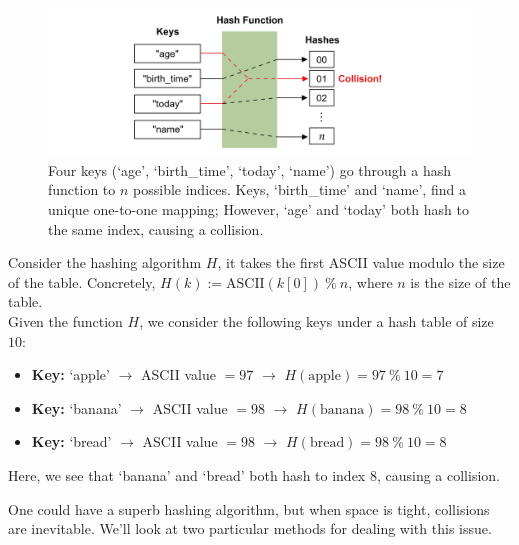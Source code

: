 \begin{figure}[ht!]

    \centering
    \includegraphics[width=\textwidth]{Sections/hash/collision.png}
    \caption{Four keys (`age', `birth\_time', `today', `name') go through a hash function to $n$ possible indices.
    Keys, `birth\_time' and `name', find a unique one-to-one mapping; However, `age' and `today' both hash to the same index, causing a collision.}
    \label{fig:collision}
\end{figure}
\begin{Example}

    Consider the hashing algorithm $H$, it takes the first ASCII value modulo the size 
    of the table. Concretely, $H(k):=\text{ASCII}(k[0])\ \%\ n$, where $n$ is the size of the table.\\

    \noindent
    Given the function $H$, we consider the following keys under a hash table of size $10$:

    \begin{itemize}
        \item \textbf{Key:} `apple' $\rightarrow$ ASCII value $=97$ $\rightarrow$ $H(\text{apple})=97\ \%\ 10 = 7$
        \item \textbf{Key:} `banana' $\rightarrow$ ASCII value $=98$ $\rightarrow$ $H(\text{banana})=98\ \%\ 10 = 8$
        \item \textbf{Key:} `bread' $\rightarrow$ ASCII value $=98$ $\rightarrow$ $H(\text{bread})=98\ \%\ 10 = 8$
    \end{itemize}
    
    \noindent
    Here, we see that `banana' and `bread' both hash to index $8$, causing a collision.
\end{Example}
One could have a superb hashing algorithm, but when space is tight, collisions are inevitable. We'll look at two particular methods for dealing with this issue.

\newpage 

